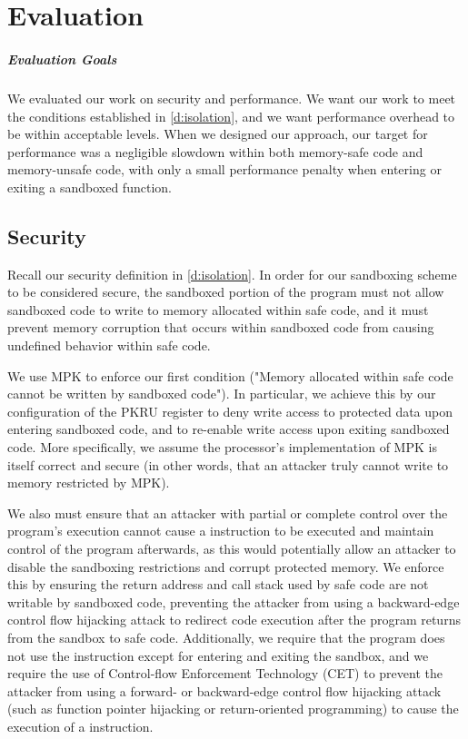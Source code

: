 \chapter{Evaluation}
\label{s:eval}

\paragraph{Evaluation Goals} We evaluated our work on security and performance. We want our work to
meet the conditions established in \autoref{d:isolation}, and we want performance overhead to be
within acceptable levels. When we designed our approach, our target for performance was a negligible
slowdown within both memory-safe code and memory-unsafe code, with only a small performance penalty
when entering or exiting a sandboxed function.

\section{Security}

Recall our security definition in \autoref{d:isolation}. In order for our sandboxing scheme to be
considered secure, the sandboxed portion of the program must not allow sandboxed code to write to
memory allocated within safe code, and it must prevent memory corruption that occurs within
sandboxed code from causing undefined behavior within safe code.

We use MPK to enforce our first condition ("Memory allocated within safe code cannot be written by
sandboxed code"). In particular, we achieve this by our configuration of the PKRU register to deny
write access to protected data upon entering sandboxed code, and to re-enable write access upon
exiting sandboxed code. More specifically, we assume the processor's implementation of MPK is itself
correct and secure (in other words, that an attacker truly cannot write to memory restricted by
MPK).

We also must ensure that an attacker with partial or complete control over the program's execution
cannot cause a  instruction to be executed and maintain control of the program
afterwards, as this would potentially allow an attacker to disable the sandboxing restrictions and
corrupt protected memory. We enforce this by ensuring the return address and call stack used by safe
code are not writable by sandboxed code, preventing the attacker from using a backward-edge control
flow hijacking attack to redirect code execution after the program returns from the sandbox to safe
code. Additionally, we require that the program does not use the  instruction except for
entering and exiting the sandbox, and we require the use of Control-flow Enforcement Technology
(CET) to prevent the attacker from using a forward- or backward-edge control flow hijacking attack
(such as function pointer hijacking or return-oriented programming) to cause the execution of a
 instruction.

